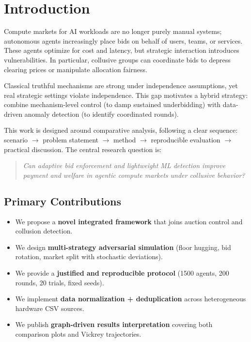 \documentclass[journal]{IEEEtran}
\begin{document}
\section{Introduction}
Compute markets for AI workloads are no longer purely manual systems; autonomous agents increasingly place bids on behalf of users, teams, or services. These agents optimize for cost and latency, but strategic interaction introduces vulnerabilities. In particular, collusive groups can coordinate bids to depress clearing prices or manipulate allocation fairness.

Classical truthful mechanisms are strong under independence assumptions, yet real strategic settings violate independence. This gap motivates a hybrid strategy: combine mechanism-level control (to damp sustained underbidding) with data-driven anomaly detection (to identify coordinated rounds).

This work is designed around comparative analysis, following a clear sequence: scenario $\rightarrow$ problem statement $\rightarrow$ method $\rightarrow$ reproducible evaluation $\rightarrow$ practical discussion. The central research question is:
\begin{quote}
\emph{Can adaptive bid enforcement and lightweight ML detection improve payment and welfare in agentic compute markets under collusive behavior?}
\end{quote}

\subsection{Primary Contributions}
\begin{itemize}[leftmargin=*]
    \item We propose a \textbf{novel integrated framework} that joins auction control and collusion detection.
    \item We design \textbf{multi-strategy adversarial simulation} (floor hugging, bid rotation, market split with stochastic deviations).
    \item We provide a \textbf{justified and reproducible protocol} (1500 agents, 200 rounds, 20 trials, fixed seeds).
    \item We implement \textbf{data normalization + deduplication} across heterogeneous hardware CSV sources.
    \item We publish \textbf{graph-driven results interpretation} covering both comparison plots and Vickrey trajectories.
\end{itemize}
\end{document}
